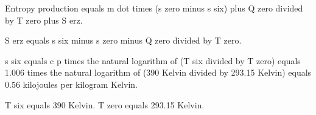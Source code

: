 Entropy production equals m dot times (s zero minus s six) plus Q zero divided by T zero plus S erz.  

S erz equals s six minus s zero minus Q zero divided by T zero.  

s six equals c p times the natural logarithm of (T six divided by T zero) equals 1.006 times the natural logarithm of (390 Kelvin divided by 293.15 Kelvin) equals 0.56 kilojoules per kilogram Kelvin.  

T six equals 390 Kelvin.  
T zero equals 293.15 Kelvin.